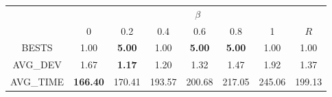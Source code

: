 \begin{tabular}{|c|ccccccc|}
    \toprule
        & \multicolumn{7}{c|}{$\beta$} \\
        &    0 &    0.2 &    0.4 &    0.6 &    0.8 &    1 & $R$ \\
    \midrule
        BESTS & 1.00 & \bfseries 5.00 & 1.00 & \bfseries 5.00 & \bfseries 5.00 & 1.00 & 1.00 \\
        AVG\_DEV & 1.67 & \bfseries 1.17 & 1.20 & 1.32 & 1.47 & 1.92 & 1.37 \\
        AVG\_TIME & \bfseries 166.40 & 170.41 & 193.57 & 200.68 & 217.05 & 245.06 & 199.13 \\
    \bottomrule
\end{tabular}
